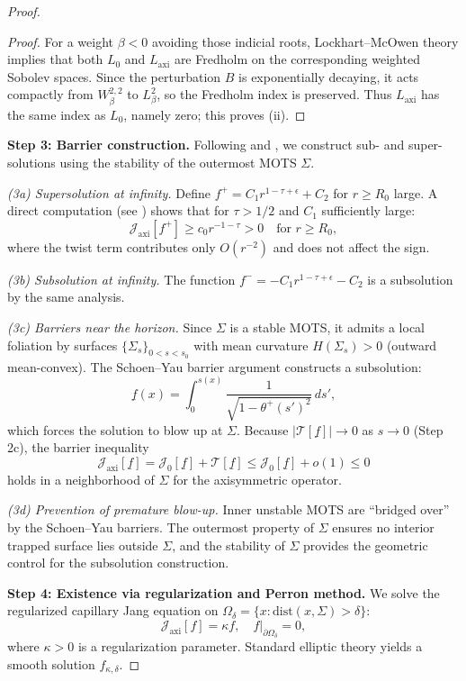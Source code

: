 \begin{proof}
\begin{proof}
For a weight $\beta<0$ avoiding those indicial roots, Lockhart--McOwen theory implies that both $L_0$ and $L_{\mathrm{axi}}$ are Fredholm on the corresponding weighted Sobolev spaces. Since the perturbation $B$ is exponentially decaying, it acts compactly from $W^{2,2}_\beta$ to $L^2_\beta$, so the Fredholm index is preserved. Thus $L_{\mathrm{axi}}$ has the same index as $L_0$, namely zero; this proves (ii).
\end{proof}

\textbf{Step 3: Barrier construction.}
Following \cite{hankhuri2013} and \cite{schoen1981}, we construct sub- and super-solutions using the stability of the outermost MOTS $\Sigma$.

\textit{(3a) Supersolution at infinity.} Define $f^+ = C_1 r^{1-\tau+\epsilon} + C_2$ for $r \geq R_0$ large. A direct computation (see \cite[Section 4]{hankhuri2013}) shows that for $\tau > 1/2$ and $C_1$ sufficiently large:
\[
\mathcal{J}_{\text{axi}}[f^+] \geq c_0 r^{-1-\tau} > 0 \quad \text{for } r \geq R_0,
\]
where the twist term contributes only $O(r^{-2})$ and does not affect the sign.

\textit{(3b) Subsolution at infinity.} The function $f^- = -C_1 r^{1-\tau+\epsilon} - C_2$ is a subsolution by the same analysis.

\textit{(3c) Barriers near the horizon.} Since $\Sigma$ is a stable MOTS, it admits a local foliation by surfaces $\{\Sigma_s\}_{0 < s < s_0}$ with mean curvature $H(\Sigma_s) > 0$ (outward mean-convex). The Schoen--Yau barrier argument \cite{schoen1981} constructs a subsolution:
\[
\underline{f}(x) = \int_0^{s(x)} \frac{1}{\sqrt{1 - \theta^+(s')^2}} \, ds',
\]
which forces the solution to blow up at $\Sigma$. Because $|\mathcal{T}[\underline{f}]| \to 0$ as $s \to 0$ (Step 2c), the barrier inequality
\[
\mathcal{J}_{\text{axi}}[\underline{f}] = \mathcal{J}_0[\underline{f}] + \mathcal{T}[\underline{f}] \leq \mathcal{J}_0[\underline{f}] + o(1) \leq 0
\]
holds in a neighborhood of $\Sigma$ for the axisymmetric operator.

\textit{(3d) Prevention of premature blow-up.} Inner unstable MOTS are ``bridged over'' by the Schoen--Yau barriers. The outermost property of $\Sigma$ ensures no interior trapped surface lies outside $\Sigma$, and the stability of $\Sigma$ provides the geometric control for the subsolution construction.

\textbf{Step 4: Existence via regularization and Perron method.}
We solve the regularized capillary Jang equation on $\Omega_\delta = \{x : \mathrm{dist}(x, \Sigma) > \delta\}$:
\[
\mathcal{J}_{\text{axi}}[f] = \kappa f, \quad f|_{\partial\Omega_\delta} = 0,
\]
where $\kappa > 0$ is a regularization parameter. Standard elliptic theory \cite{gilbargtrudinger2001} yields a smooth solution $f_{\kappa,\delta}$.


\end{proof}
